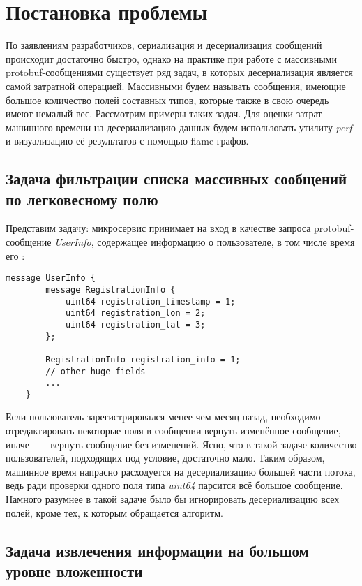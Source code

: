 \section{Постановка проблемы}

По заявлениям разработчиков, сериализация и десериализация сообщений происходит достаточно быстро, однако
на практике при работе с массивными protobuf-сообщениями существует ряд задач, в которых десериализация является самой затратной операцией.
Массивными будем называть сообщения, имеющие большое количество полей составных типов, которые также в свою очередь имеют немалый вес.
Рассмотрим примеры таких задач. Для оценки затрат машинного времени на десериализацию данных будем использовать утилиту \textit{perf} и визуализацию её результатов с помощью flame-графов.

\subsection{Задача фильтрации списка массивных сообщений по легковесному полю}
\label{sec_problem:sec:problem1}

Представим задачу: микросервис принимает на вход в качестве запроса protobuf-сообщение \textit{UserInfo}, содержащее информацию о пользователе,
в том числе время его :

\begin{lstlisting}[style=CodeListing, label={sec_problem:listing:userinfo}, caption={protobuf-сообщение UserInfo}]
    message UserInfo {
        message RegistrationInfo {
            uint64 registration_timestamp = 1;
            uint64 registration_lon = 2;
            uint64 registration_lat = 3;
        };

        RegistrationInfo registration_info = 1;
        // other huge fields
        ... 
    }
\end{lstlisting}

Если пользователь зарегистрировался менее чем месяц назад, необходимо отредактировать некоторые поля в сообщении вернуть изменённое сообщение,
иначе ~--~ вернуть сообщение без изменений. Ясно, что в такой задаче количество пользователей, подходящих под условие, достаточно мало.
Таким образом, машинное время напрасно расходуется на десериализацию большей части потока, ведь ради проверки одного поля типа \textit{uint64} парсится всё большое сообщение.
Намного разумнее в такой задаче было бы игнорировать десериализацию всех полей, кроме тех, к которым обращается алгоритм.

\subsection{Задача извлечения информации на большом уровне вложенности}

